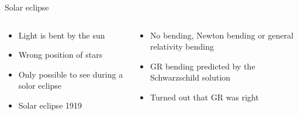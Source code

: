 \documentclass{beamer}
\begin{document}
\begin{frame}{Solar eclipse}
  \begin{columns}
    \begin{column}{0.5\textwidth}
     \begin{itemize}
       \item{Light is bent by the sun}
       \item{Wrong position of stars}
       \item{Only possible to see during a solor eclipse}
       \item{Solar eclipse 1919}
       \end{itemize}
    \end{column}
    \begin{column}{0.5\textwidth}
    \begin{itemize}
    \item{No bending, Newton bending or general relativity bending}
    \item{GR bending predicted by the Schwarzschild solution}
    \item{Turned out that GR was right}
    \end{itemize}
    \end{column}
    \end{columns}


 \end{frame}
\end{document}
